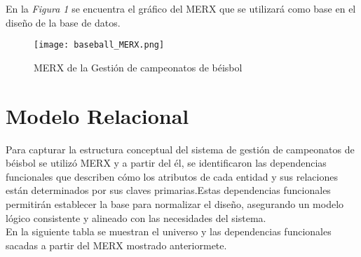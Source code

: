 \documentclass{report}
\begin{document}
    En la \textit{Figura 1} se encuentra el gráfico del MERX que se utilizará como base en el diseño de la base de 
    datos.

    \begin{figure}[H] 
        \centering
        \texttt{[image: baseball\_MERX.png]}
        \caption{MERX de la Gestión de campeonatos de béisbol}
    \end{figure}

    \newpage

    \section*{Modelo Relacional}

    Para capturar la estructura conceptual del sistema de gestión de campeonatos de béisbol se utilizó MERX y a 
    partir del él, se identificaron las dependencias funcionales que describen cómo los atributos de cada entidad 
    y sus relaciones están determinados por sus claves primarias.Estas dependencias funcionales permitirán 
    establecer la base para normalizar el diseño, asegurando un modelo lógico consistente y alineado con las 
    necesidades del sistema. \\

    En la siguiente tabla se muestran el universo y las dependencias funcionales sacadas a partir del MERX mostrado 
    anteriormete. \newline 
\end{document}
